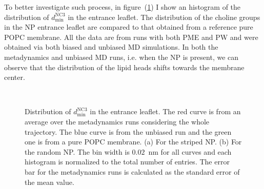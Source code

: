 To better investigate such process, in figure~(\ref{fig:NC3minDist}) I show an histogram of the distribution of $d_\text{min}^{\text{NC}3}$ in the entrance leaflet. The distribution of the choline groups in the \ac{NP} entrance leaflet are compared to that obtained from a reference pure \ac{POPC} membrane. All the data are from runs with both \ac{PME} and \ac{PW} and were obtained via both biased and unbiased \ac{MD} simulations. In both the metadynamics and unbiased \ac{MD} runs, i.e. when the \ac{NP} is present, we can observe that the distribution of the lipid heads shifts towards the membrane center. 
\begin{figure}[th!]
	\center
	\\%
	\caption{Distribution of $d_\text{min}^{\text{NC}3}$ in the entrance leaflet. The red curve is from an average over the metadynamics runs considering the whole trajectory. The blue curve is from the unbiased run and the green one is from a pure \acs{POPC} membrane. (a) For the striped \acs{NP}. (b) For the random \acs{NP}. The bin width is $0.02$~nm for all curves and each histogram is normalized to the total number of entries. The error bar for the metadynamics runs is calculated as the standard error of the mean value.}%
	\label{fig:NC3minDist}
\end{figure}

